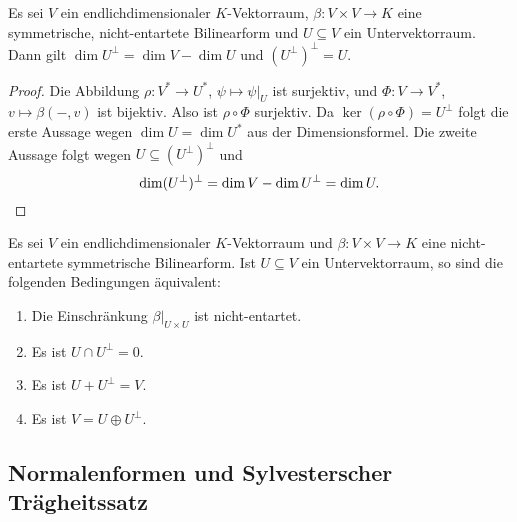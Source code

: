 \begin{proposition}
  Es sei $V$ ein endlichdimensionaler $K$-Vektorraum, $\beta \colon V \times V \to K$ eine symmetrische, nicht-entartete Bilinearform und $U \subseteq V$ ein Untervektorraum.
  Dann gilt $\dim U^\perp = \dim V - \dim U$ und $(U^\perp)^\perp = U$.
\end{proposition}


\begin{proof}
  Die Abbildung $\rho \colon V^* \to U^*$, $\psi \mapsto \psi|_U$ ist surjektiv, und $\Phi \colon V \to V^*$, $v \mapsto \beta(-,v)$ ist bijektiv.
  Also ist $\rho \circ \Phi$ surjektiv.
  Da $\ker(\rho \circ \Phi) = U^\perp$ folgt die erste Aussage wegen $\dim U = \dim U^*$ aus der Dimensionsformel.
  Die zweite Aussage folgt wegen $U \subseteq (U^\perp)^\perp$ und
  \[
      \dim (U^\perp)^\perp
    = \dim V - \dim U^\perp
    = \dim U.
    \qedhere
  \]
\end{proof}



\begin{proposition}
  Es sei $V$ ein endlichdimensionaler $K$-Vektorraum und $\beta \colon V \times V \to K$ eine nicht-entartete symmetrische Bilinearform.
  Ist $U \subseteq V$ ein Untervektorraum, so sind die folgenden Bedingungen äquivalent:
  \begin{enumerate}[leftmargin=*, label=\roman*)]
    \item
      Die Einschränkung $\beta|_{U \times U}$ ist nicht-entartet.
    \item
      Es ist $U \cap U^\perp = 0$.
    \item
      Es ist $U + U^\perp = V$.
    \item
      Es ist $V = U \oplus U^\perp$.
  \end{enumerate}
\end{proposition}











\subsection{Normalenformen und Sylvesterscher Trägheitssatz}


